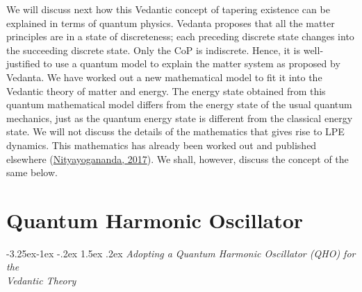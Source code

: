 \documentclass[twoside, 13pt]{article}
\makeatletter
\renewcommand\subsection{\@startsection{subsection}{2}{\z@}%
                                     {-3.25ex\@plus -1ex \@minus -.2ex}%
                                     {1.5ex \@plus .2ex}%
                                     {\normalfont\Large\bfseries}}
\makeatother
\begin{document}
{{\fontsize{12}{14}\selectfont We will discuss next how this Vedantic concept of tapering existence can be explained in terms of quantum physics. Vedanta proposes that all the matter principles are in a state of discreteness; each preceding discrete state changes into the succeeding discrete state. Only the CoP is indiscrete. Hence, it is well-justified to use a quantum model to explain the matter system as proposed by Vedanta. We have worked out a new mathematical model to fit it into the Vedantic theory of matter and energy. The energy state obtained from this quantum mathematical model differs from the energy state of the usual quantum mechanics, just as the quantum energy state is different from the classical energy state. We will not discuss the details of the mathematics that gives rise to LPE dynamics. This mathematics has already been worked out and published elsewhere (\underline{Nityayogananda, 2017}). We shall, however, discuss the concept of the same below.}

\vspace{.2cm}

{\fontsize{18}{20}\selectfont\section{Quantum Harmonic Oscillator}}\label{sec-3}

\vspace{-.3cm}

{\fontsize{8}{10}\selectfont\subsection{\textit{Adopting a Quantum Harmonic Oscillator (QHO) for the\\ Vedantic Theory}}}\label{subsec-3.1}


}
\end{document}
